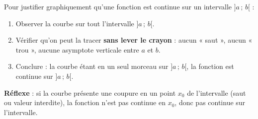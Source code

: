 \documentclass[11pt]{article}
\begin{document}
\begin{methode}
Pour justifier graphiquement qu'une fonction est continue sur un intervalle $]a\,;\,b[$ :
\begin{enumerate}
\item Observer la courbe sur tout l'intervalle $]a\,;\,b[$.
\item Vérifier qu'on peut la tracer \textbf{sans lever le crayon} : aucun « saut », aucun « trou », aucune asymptote verticale entre $a$ et $b$.
\item Conclure : la courbe étant en un seul morceau sur $]a\,;\,b[$, la fonction est continue sur $]a\,;\,b[$.
\end{enumerate}
\textbf{Réflexe} : si la courbe présente une coupure en un point $x_0$ de l'intervalle (saut ou valeur interdite), la fonction n'est pas continue en $x_0$, donc pas continue sur l'intervalle.
\end{methode}
\end{document}
